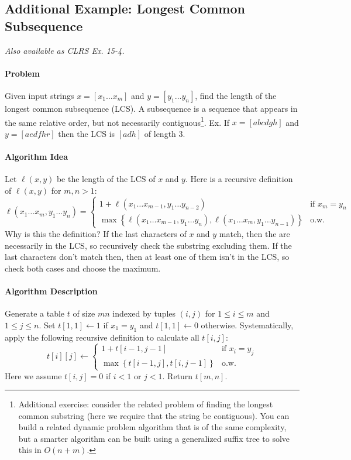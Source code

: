 \documentclass[10pt]{article}
\theoremstyle{plain}
\theoremstyle{definition}
\numberwithin{equation}{section}
\numberwithin{figure}{section}
\begin{document}
\subsection{Additional Example: Longest Common Subsequence}

\noindent \textit{Also available as CLRS Ex. 15-4.}

\paragraph{Problem} Given input strings $x = [x_1 \ldots x_m]$ and $y = [y_1 \ldots y_n]$, find the length of the longest common subsequence (LCS). A subsequence is a sequence that appears in the same relative order, but not necessarily contiguous\footnote{Additional exercise: consider the related problem of finding the longest common substring (here we require that the string be contiguous). You can build a related dynamic problem algorithm that is of the same complexity, but a smarter algorithm can be built using a generalized suffix tree to solve this in $O(n + m)$.}. Ex. If $x = [abcdgh]$ and $y = [aedfhr]$ then the LCS is $[adh]$ of length 3. 

\paragraph{Algorithm Idea} Let $\ell(x, y)$ be the length of the LCS of $x$ and $y$. Here is a recursive definition of $\ell(x,y)$ for $m, n > 1$:
\begin{equation}
\ell(x_1\ldots x_m,y_1 \ldots y_n) = \begin{cases} 1 + \ell(x_1 \ldots x_{m-1}, y_1 \ldots y_{n-2}) & \text{if } x_m = y_n \\ \max \left\{ \ell(x_1 \ldots x_{m-1}, y_1 \ldots y_n), \ell(x_1 \ldots x_m, y_1 \ldots y_{n-1})\right \} & \text{o.w.}\end{cases} \label{eq:rec2}
\end{equation}
Why is this the definition? If the last characters of $x$ and $y$ match, then the are necessarily in the LCS, so recursively check the substring excluding them. If the last characters don't match then, then at least one of them isn't in the LCS, so check both cases and choose the maximum.

\paragraph{Algorithm Description} Generate a table $t$ of size $mn$ indexed by tuples $(i,j)$ for $1 \leq i \leq m$ and $1 \leq j \leq n$. Set $t[1,1] \leftarrow 1$ if $x_1 = y_1$ and $t[1,1] \leftarrow 0$ otherwise. Systematically, apply the following recursive definition to calculate all $t[i,j]$:
\begin{equation}
t[i][j] \leftarrow \begin{cases} 1 + t[i-1,j-1] & \text{if } x_i = y_j \\ \max \left\{ t[i-1,j], t[i,j-1] \right\} & \text{o.w.}\end{cases} \label{eq:rec2alg}
\end{equation}
Here we assume $t[i,j] = 0$ if $i < 1$ or $j < 1$. Return $t[m,n]$.
\end{document}
